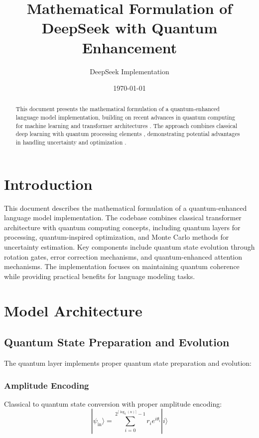 \documentclass{article}
\title{Mathematical Formulation of DeepSeek with Quantum Enhancement}
\author{DeepSeek Implementation}
\date{\today}
\begin{document}
\maketitle

\begin{abstract}
This document presents the mathematical formulation of a quantum-enhanced language model implementation, building on recent advances in quantum computing for machine learning \citep{bharti2022noisy} and transformer architectures \citep{vaswani2017attention}. The approach combines classical deep learning with quantum processing elements \citep{schuld2019quantum}, demonstrating potential advantages in handling uncertainty \citep{gal2016dropout} and optimization \citep{farhi2018classification}.
\end{abstract}

\section*{Introduction}
This document describes the mathematical formulation of a quantum-enhanced language model implementation. The codebase combines classical transformer architecture with quantum computing concepts, including quantum layers for processing, quantum-inspired optimization, and Monte Carlo methods for uncertainty estimation. Key components include quantum state evolution through rotation gates, error correction mechanisms, and quantum-enhanced attention mechanisms. The implementation focuses on maintaining quantum coherence while providing practical benefits for language modeling tasks.

\section{Model Architecture}

\subsection{Quantum State Preparation and Evolution}
The quantum layer implements proper quantum state preparation and evolution:

\subsubsection{Amplitude Encoding}
Classical to quantum state conversion with proper amplitude encoding:
\begin{equation}
|\psi_{\text{in}}\rangle = \sum_{i=0}^{2^{\lceil\log_2(n)\rceil}-1} r_i e^{i\theta_i}|i\rangle
\end{equation}
\end{document}

